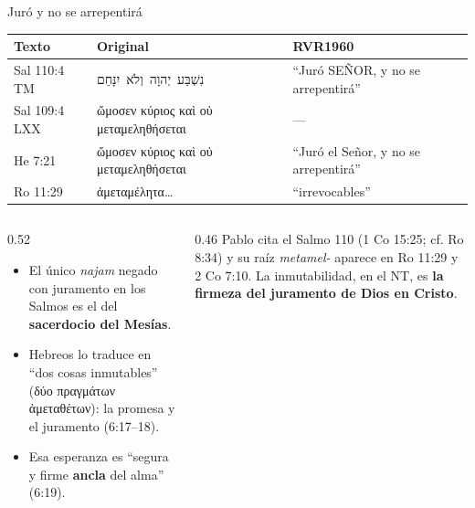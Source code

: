 \documentclass[hyperref={bookmarks=false},aspectratio=169]{beamer}
\newcommand{\heb}[1]{\mbox{\foreignlanguage{hebrew}{#1}}}
\newcommand{\grc}[1]{\foreignlanguage{ancientgreek}{#1}}
\newcommand{\SENOR}{S{\fontsize{0.78em}{1em}\selectfont EÑOR}}
\newcommand{\destacar}[1]{\textbf{\textcolor{azul}{#1}}}
\begin{document}
\begin{frame}{Juró y no se arrepentirá}
\scriptsize\renewcommand{\arraystretch}{1.18}
\begin{tabular}{@{}>{\RaggedRight\arraybackslash}p{1.6cm}>{\RaggedRight\arraybackslash}p{5.4cm}>{\RaggedRight\arraybackslash}p{4.8cm}@{}}
\toprule
\textbf{Texto} & \textbf{Original} & \textbf{RVR1960} \\ \midrule
Sal 110:4 TM & \heb{נִשְׁבַּע יְהוָה וְלֹא יִנָּחֵם} & ``Juró \SENOR, y no se arrepentirá'' \\
Sal 109:4 LXX & \grc{ὤμοσεν κύριος καὶ οὐ μεταμεληθήσεται} & --- \\
He 7:21 & \grc{ὤμοσεν κύριος καὶ οὐ μεταμεληθήσεται} & ``Juró el Señor, y no se arrepentirá'' \\
Ro 11:29 & \grc{ἀμεταμέλητα\ldots} & ``irrevocables'' \\
\bottomrule
\end{tabular}\par\medskip
\begin{columns}[t,onlytextwidth]
\begin{column}{0.52\textwidth}\small
\begin{itemize}
\item El único \emph{najam} negado con juramento en los Salmos es el del \destacar{sacerdocio del Mesías}.
\item Hebreos lo traduce en ``dos cosas inmutables'' (\grc{δύο πραγμάτων ἀμεταθέτων}): la promesa y el juramento (6:17--18).
\item Esa esperanza es ``segura y firme \destacar{ancla} del alma'' (6:19).
\end{itemize}
\end{column}
\begin{column}{0.46\textwidth}\small
Pablo cita el Salmo 110 (1 Co 15:25; cf. Ro 8:34) y su raíz \emph{metamel-} aparece en Ro 11:29 y 2 Co 7:10. La inmutabilidad, en el NT, es \destacar{la firmeza del juramento de Dios en Cristo}.
\end{column}
\end{columns}
\end{frame}
\end{document}
